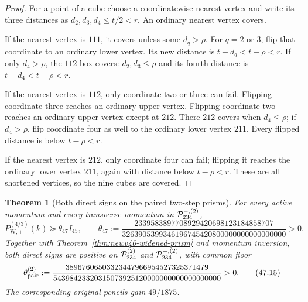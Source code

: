 \documentclass[11pt,oneside]{article}
\newtheorem{theorem}{Theorem}[section]
\theoremstyle{definition}
\theoremstyle{remark}
\begin{document}
\begin{proof}
For a point of a cube choose a coordinatewise nearest vertex and
write its three distances as \(d_2,d_3,d_4\le t/2<r\).  An
ordinary nearest vertex covers.

If the nearest vertex is \(111\), it covers unless some
\(d_q>\rho\).  For \(q=2\) or \(3\), flip that coordinate to an
ordinary lower vertex.  Its new distance is
\(t-d_q<t-\rho<r\).  If only \(d_4>\rho\), the \(112\) box covers:
\(d_2,d_3\le\rho\) and its fourth distance is
\(t-d_4<t-\rho<r\).

If the nearest vertex is \(112\), only coordinate two or three can
fail.  Flipping coordinate three reaches an ordinary upper vertex.
Flipping coordinate two reaches an ordinary upper vertex except
at \(212\).  There \(212\) covers when \(d_4\le\rho\); if
\(d_4>\rho\), flip coordinate four as well to the ordinary lower
vertex \(211\).  Every flipped distance is below
\(t-\rho<r\).

If the nearest vertex is \(212\), only coordinate four can fail;
flipping it reaches the ordinary lower vertex \(211\), again with
distance below \(t-\rho<r\).  These are all shortened vertices, so
the nine cubes are covered.
\end{proof}

\begin{theorem}[Both direct signs on the paired two-step prisms]
\label{thm:newv47-paired-two-step-prisms}
For every active momentum and every transverse momentum in
\({\cal P}_{234}^{-,(2)}\),
\[
 P_{\mathrm W,+}^{(4/3)}(k)
 \succeq\theta_{47}^{-}I_{45},\qquad
 \theta_{47}^{-}:=
 \frac{2339583897708929420698123184858707}
 {3263905399346196745420800000000000000000}>0.         \tag{47.14}
\]
Together with Theorem~\ref{thm:newv40-widened-prism} and momentum
inversion, both direct signs are positive on
\({\cal P}_{234}^{(2)}\) and \({\cal P}_{234}^{-,(2)}\), with
common floor
\[
 \theta_{\rm pair}^{(2)}:=
 \frac{38967606503323447966954527325371479}
 {54398423320315073925120000000000000000000}>0.        \tag{47.15}
\]
The corresponding original pencils gain \(49/1875\).
\end{theorem}
\end{document}
